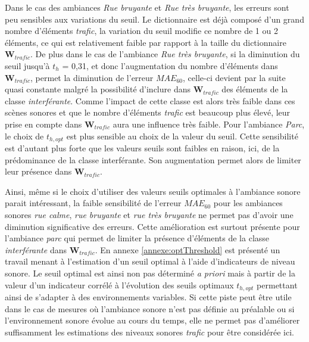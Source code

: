 Dans le cas des ambiances \textit{Rue bruyante} et \textit{Rue très bruyante}, les erreurs sont peu sensibles aux variations du seuil. Le dictionnaire est déjà composé d'un grand nombre d'éléments \textit{trafic}, la variation du seuil modifie ce nombre de 1 ou 2 éléments, ce qui est relativement faible par rapport à la taille du dictionnaire $\mathbf{W}_{trafic}$. 
De plus dans le cas de l'ambiance \textit{Rue très bruyante}, si la diminution du seuil jusqu'à $t_h$ = 0,31, et donc l'augmentation du nombre d'éléments dans $\mathbf{W}_{trafic}$, permet la diminution de l'erreur $MAE_{60}$, celle-ci devient par la suite quasi constante malgré la possibilité d'inclure dans $\mathbf{W}_{trafic}$ des éléments de la classe \textit{interférante}. 
Comme l'impact de cette classe est alors très faible dans ces scènes sonores et que le nombre d'éléments \textit{trafic} est beaucoup plus élevé, leur prise en compte dans $\mathbf{W}_{trafic}$ aura une influence très faible. 
Pour l'ambiance \textit{Parc}, le choix de $t_{h,opt}$ est plus sensible au choix de la valeur du seuil. Cette sensibilité est d'autant plus forte que les valeurs seuils sont faibles en raison, ici, de la prédominance de la classe interférante. Son augmentation permet alors de limiter leur présence dans $\mathbf{W}_{trafic}$.

Ainsi, même si le choix d'utiliser des valeurs seuils optimales à l'ambiance sonore parait intéressant, la faible sensibilité de l'erreur $MAE_{60}$ pour les ambiances sonores \textit{rue calme}, \textit{rue bruyante} et \textit{rue très bruyante} ne permet pas d'avoir une diminution significative des erreurs. Cette amélioration est surtout présente pour l'ambiance \textit{parc} qui permet de limiter la présence d'éléments de la classe \textit{interférante} dans $\mathbf{W}_{trafic}$.
En annexe \ref{annexe:optThreshold} est présenté un travail menant à l'estimation d'un seuil optimal à l'aide d'indicateurs de niveau sonore. Le seuil optimal est ainsi non pas déterminé \textit{a priori} mais à partir de la valeur d'un indicateur corrélé à l'évolution des seuils optimaux $t_{h,opt}$ permettant ainsi de s'adapter à des environnements variables. Si cette piste peut être utile dans le cas de mesures où l'ambiance sonore n'est pas définie au préalable ou si l'environnement sonore évolue au cours du temps, elle ne permet pas d'améliorer suffisamment les estimations des niveaux sonores \textit{trafic} pour être considérée ici.

